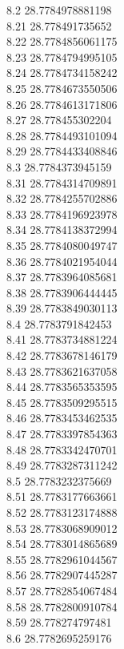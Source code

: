 {8.2	28.7784978881198\\
8.21	28.778491735652\\
8.22	28.7784856061175\\
8.23	28.7784794995105\\
8.24	28.7784734158242\\
8.25	28.7784673550506\\
8.26	28.7784613171806\\
8.27	28.778455302204\\
8.28	28.7784493101094\\
8.29	28.7784433408846\\
8.3	28.7784373945159\\
8.31	28.7784314709891\\
8.32	28.7784255702886\\
8.33	28.7784196923978\\
8.34	28.7784138372994\\
8.35	28.7784080049747\\
8.36	28.7784021954044\\
8.37	28.7783964085681\\
8.38	28.7783906444445\\
8.39	28.7783849030113\\
8.4	28.7783791842453\\
8.41	28.7783734881224\\
8.42	28.7783678146179\\
8.43	28.7783621637058\\
8.44	28.7783565353595\\
8.45	28.7783509295515\\
8.46	28.7783453462535\\
8.47	28.7783397854363\\
8.48	28.7783342470701\\
8.49	28.7783287311242\\
8.5	28.7783232375669\\
8.51	28.7783177663661\\
8.52	28.7783123174888\\
8.53	28.7783068909012\\
8.54	28.7783014865689\\
8.55	28.7782961044567\\
8.56	28.7782907445287\\
8.57	28.7782854067484\\
8.58	28.7782800910784\\
8.59	28.778274797481\\
8.6	28.7782695259176\\
}

